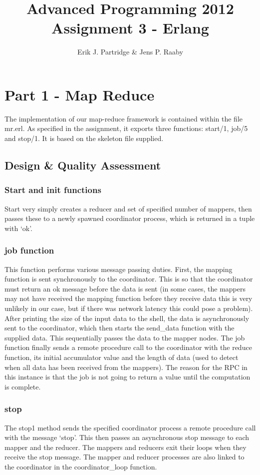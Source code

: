 \documentclass{article}
\title{Advanced Programming 2012\\
Assignment 3 - Erlang}
\author{Erik J. Partridge \& Jens P. Raaby}
\begin{document}
 
\maketitle


\section{Part 1 - Map Reduce}
The implementation of our map-reduce framework is contained within the file mr.erl. As specified in the assignment, it exports three functions: start/1, job/5 and stop/1. It is based on the skeleton file supplied.

\subsection{Design \& Quality Assessment}
\subsubsection{Start and init functions}
Start very simply creates a reducer and set of specified number of mappers, then passes these to a newly spawned coordinator process, which is returned in a tuple with `ok'.

\subsubsection{job function}
This function performs various message passing duties. First, the mapping function is sent synchronously to the coordinator. This is so that the coordinator must return an ok message before the data is sent (in some cases, the mappers may not have received the mapping function before they receive data \- this is very unlikely in our case, but if there was network latency this could pose a problem).
After printing the size of the input data to the shell, the data is asynchronously sent to the coordinator, which then starts the send\_data function with the supplied data. This sequentially passes the data to the mapper nodes. 
The job function finally sends a remote procedure call to the coordinator with the reduce function, its initial accumulator value and the length of data (used to detect when all data has been received from the mappers). The reason for the RPC in this instance is that the job is not going to return a value until the computation is complete.

\subsubsection{stop}
The stop\/1 method sends the specified coordinator process a remote procedure call with the message `stop'. This then passes an asynchronous stop message to each mapper and the reducer. The mappers and reducers exit their loops when they receive the stop message. The mapper and reducer processes are also linked to the coordinator in the coordinator\_loop function. 
\end{document}
